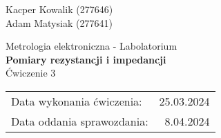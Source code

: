 \begin{flushright}
    Kacper Kowalik (277646) \\
    Adam Matysiak (277641)
\end{flushright}

\vspace{2mm}

\begin{center}
    Metrologia elektroniczna - Labolatorium \\
    \vspace{15px}
    {\Large{\textbf{Pomiary rezystancji i impedancji}}} \\
    \vspace{15px}
    Ćwiczenie 3 \\
\end{center}
    
\begin{flushright}
    \begin{tabular}{lr}
         Data wykonania ćwiczenia:  & 25.03.2024 \\
         Data oddania sprawozdania: & 8.04.2024
    \end{tabular}
\end{flushright}